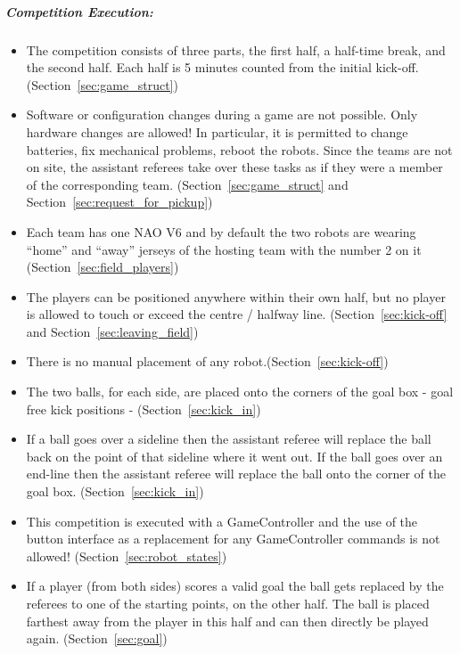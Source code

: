 \subparagraph{Competition Execution:}
\begin{itemize}
	\item The competition consists of three parts, the first half, a half-time break, and the second half. Each half is 5 minutes counted from the initial kick-off. (\cf Section~\ref{sec:game_struct})
	
	\item Software or configuration changes during a game are not possible. Only hardware changes are allowed! In particular, it is permitted to change batteries, fix mechanical problems, reboot the robots. Since the teams are not on site, the assistant referees take over these tasks as if they were a member of the corresponding team. (\cf Section~\ref{sec:game_struct} and Section~\ref{sec:request_for_pickup})
	
	\item Each team has one NAO V6 and by default the two robots are wearing ``home'' and ``away'' jerseys of the hosting team with the number 2 on it (\cf Section~\ref{sec:field_players})
	
	\item The players can be positioned anywhere within their own half, but no player is allowed to touch or exceed the centre / halfway line. (\cf Section~\ref{sec:kick-off} and Section~\ref{sec:leaving_field})
	
	\item There is no manual placement of any robot.(\cf Section~\ref{sec:kick-off})
	
	\item The two balls, for each side, are placed onto the corners of the goal box - goal free kick positions - (\cf Section~\ref{sec:kick_in})
	
	\item If a ball goes over a sideline then the assistant referee will replace the ball back on the point of that sideline where it went out. If the ball goes over an end-line then the assistant referee will replace the ball onto the corner of the goal box. (\cf Section~\ref{sec:kick_in})
	
	\item This competition is executed with a GameController and the use of the button interface as a replacement for any GameController commands is not allowed! (\cf Section~\ref{sec:robot_states})
	
	\item If a player (from both sides) scores a valid goal the ball gets replaced by the referees to one of the starting points, on the other half. The ball is placed farthest away from the player in this half and can then directly be played again. (\cf Section~\ref{sec:goal})
	

\end{itemize}
